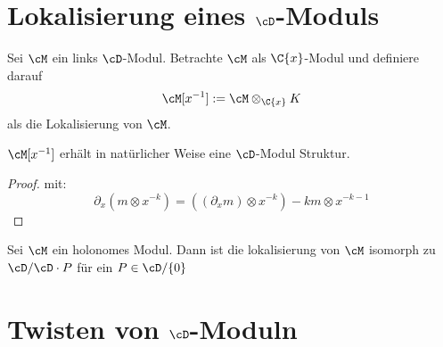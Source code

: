 \section{Lokalisierung eines $\cD$-Moduls}
\cite[Chap 4.2.]{sabbah_cimpa90}
Sei $\cM$ ein links $\cD$-Modul. Betrachte $\cM$ als $\C\{x\}$-Modul und
definiere darauf
\[ \cM[x^{-1}]:=\cM\otimes_{\C\{x\}}K \]
als die Lokalisierung von $\cM$.
\begin{prop} \cite[Prop 4.2.1.]{sabbah_cimpa90}
$\cM[x^{-1}]$ erhält in natürlicher Weise eine $\cD$-Modul Struktur.
\end{prop}
\begin{proof} \cite[Prop 4.2.1.]{sabbah_cimpa90}
mit:
\[
\partial_x(m\otimes x^{-k})=((\partial_xm)\otimes x^{-k})-km\otimes x^{-k-1}
\]
\begin{comment}
beweis der $\cD$-linearität ist als übung gelassen
\end{comment}
\end{proof}
\begin{cor}\cite[Cor 4.2.8.]{sabbah_cimpa90}
Sei $\cM$ ein holonomes Modul. Dann ist die lokalisierung von $\cM$ isomorph zu
$\cD/\cD\cdot P$ für ein $P\in\cD/\{0\}$
\end{cor}

\section{Twisten von $\cD$-Moduln}
\cite[Chap 5 §2]{coutinho1995primer}

